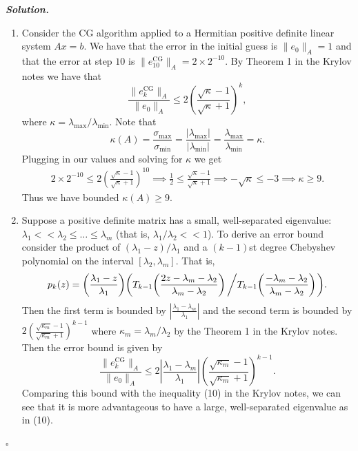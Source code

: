 \documentclass[12pt]{report}
\newenvironment{solution}[1][\it{Solution}]{\textbf{#1. } }{$\square$}
\newcommand{\paren}[1]{{\left(#1\right)}} %
\newcommand{\abs}[1]{{\left|#1\right|}} %
\begin{document}
\begin{solution}
    
    \begin{enumerate}
        \item 
        Consider the CG algorithm applied to a Hermitian positive definite linear system $Ax = b$. We have that the error in the initial guess is $\|e_0\|_A = 1$ and that the error at step $10$ is $\| e^{\text{CG}}_{10} \|_{A} = 2 \times 2^{-10}$. By Theorem 1 in the Krylov notes we have that
        \[ 
            \frac{\|e^{\text{CG}}_{k} \|_{A}}{\|e_0\|_A} \leq 2\paren{\frac{\sqrt{\kappa} - 1}{\sqrt{\kappa} + 1}}^k,
        \]
        where $\kappa = \lambda_{\text{max}} / \lambda_{\text{min}}$. Note that
        \[ \kappa(A) = \frac{\sigma_{\text{max}}}{\sigma_{\text{min}}} = \frac{|\lambda_{\text{max}}|}{|\lambda_{\text{min}}|} = \frac{\lambda_{\text{max}}}{\lambda_{\text{min}}} = \kappa.\] 
        Plugging in our values and solving for $\kappa$ we get
        \begin{align*}
            2\times 2^{-10} \leq 2\paren{\frac{\sqrt{\kappa} - 1}{\sqrt{\kappa} + 1}}^{10} \implies
            \frac{1}{2} \leq \frac{\sqrt{\kappa} - 1}{\sqrt{\kappa} + 1} \implies
            -\sqrt{\kappa} \leq -3 \implies
            \kappa \geq 9.
        \end{align*}
        Thus we have bounded $\kappa(A) \geq 9$.
        \item 
        Suppose a positive definite matrix has a small, well-separated eigenvalue:
        $\lambda_1 << \lambda_2 \leq \ldots \leq \lambda_m$ (that is, $\lambda_1 / \lambda_2 << 1$). To derive an error bound consider the product of $(\lambda_1 - z)/\lambda_1$ and a $(k-1)$st degree Chebyshev polynomial on the interval $[\lambda_2,\lambda_m].$ That is,
        \[
            p_k(z)=\paren{\frac{\lambda_1 - z}{\lambda_1}} \paren{T_{k-1}\paren{\frac{2z - \lambda_m -\lambda_2}{\lambda_m - \lambda_2}} \left/T_{k-1}\paren{\frac{-\lambda_m - \lambda_2}{\lambda_m - \lambda_2}}\right.}.
        \]
        Then the first term is bounded by $\abs{\frac{\lambda_1 - \lambda_m}{\lambda_1}}$ and the second term is bounded by $2\paren{\frac{\sqrt{\kappa_m} - 1}{\sqrt{\kappa_m} + 1}}^{k-1}$ where $\kappa_m = \lambda_m/\lambda_2$ by the Theorem 1 in the Krylov notes. Then the error bound is given by 
        \[ 
            \frac{\|e^{\text{CG}}_{k} \|_{A}}{\|e_0\|_A} \leq 2\abs{\frac{\lambda_1 - \lambda_m}{\lambda_1}}\paren{\frac{\sqrt{\kappa_m} - 1}{\sqrt{\kappa_m} + 1}}^{k-1}.
        \]
        Comparing this bound with the inequality (10) in the Krylov notes, we can see that it is more advantageous to have a large, well-separated eigenvalue as in (10).
    \end{enumerate}
\end{solution}
\end{document}
